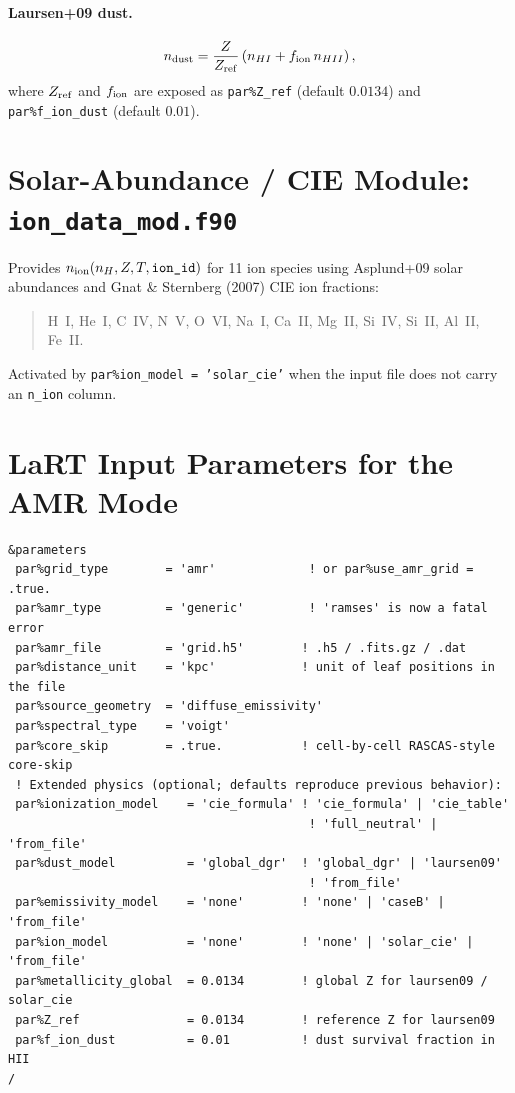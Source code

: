 \documentclass[english,a4paper]{my_memo}
\begin{document}
\paragraph{Laursen+09 dust.}
\[
   n_{\rm dust} = \frac{Z}{Z_{\rm ref}}
                  \left(n_{HI} + f_{\rm ion}\, n_{HII}\right),
\]
where $Z_{\rm ref}$ and $f_{\rm ion}$ are exposed as \texttt{par\%Z\_ref}
(default $0.0134$) and \texttt{par\%f\_ion\_dust} (default $0.01$).

\section{Solar-Abundance / CIE Module: \texttt{ion\_data\_mod.f90}}

Provides $n_{\rm ion}(n_H, Z, T, \texttt{ion\_id})$ for 11 ion species using
Asplund+09 solar abundances and Gnat \& Sternberg (2007) CIE ion fractions:

\begin{quote}
H~I, He~I, C~IV, N~V, O~VI, Na~I, Ca~II, Mg~II, Si~IV, Si~II, Al~II, Fe~II.
\end{quote}

Activated by \texttt{par\%ion\_model = 'solar\_cie'} when the input file
does not carry an \texttt{n\_ion} column.

\section{LaRT Input Parameters for the AMR Mode}

\begin{lstlisting}[style=shellstyle]
&parameters
 par%grid_type        = 'amr'             ! or par%use_amr_grid = .true.
 par%amr_type         = 'generic'         ! 'ramses' is now a fatal error
 par%amr_file         = 'grid.h5'        ! .h5 / .fits.gz / .dat
 par%distance_unit    = 'kpc'            ! unit of leaf positions in the file
 par%source_geometry  = 'diffuse_emissivity'
 par%spectral_type    = 'voigt'
 par%core_skip        = .true.           ! cell-by-cell RASCAS-style core-skip
 ! Extended physics (optional; defaults reproduce previous behavior):
 par%ionization_model    = 'cie_formula' ! 'cie_formula' | 'cie_table'
                                          ! 'full_neutral' | 'from_file'
 par%dust_model          = 'global_dgr'  ! 'global_dgr' | 'laursen09'
                                          ! 'from_file'
 par%emissivity_model    = 'none'        ! 'none' | 'caseB' | 'from_file'
 par%ion_model           = 'none'        ! 'none' | 'solar_cie' | 'from_file'
 par%metallicity_global  = 0.0134        ! global Z for laursen09 / solar_cie
 par%Z_ref               = 0.0134        ! reference Z for laursen09
 par%f_ion_dust          = 0.01          ! dust survival fraction in HII
/
\end{lstlisting}
\end{document}
